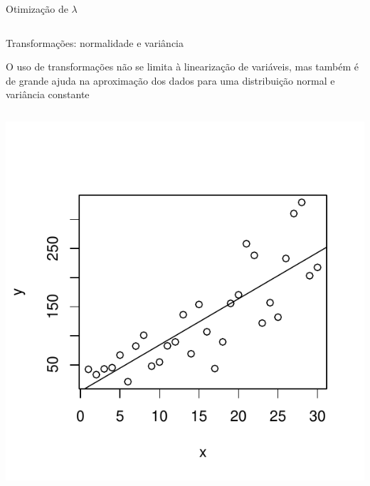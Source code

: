 \documentclass{beamer}\usepackage[]{graphicx}\usepackage[]{color}
\newenvironment{knitrout}{}{} %
\renewenvironment{knitrout}{\setlength{\topsep}{0mm}}{}
\begin{document}
\begin{frame}[fragile]{Otimização de $\lambda$}
\begin{columns}[c]
\begin{knitrout}
\end{knitrout}

\end{columns}

\end{frame}


\begin{frame}{Transformações: normalidade e variância}

 O uso de transformações não se limita à linearização de variáveis, mas também é de grande ajuda na aproximação dos dados para uma distribuição normal e variância constante
\begin{columns}[c]


\begin{knitrout}\scriptsize
{}\color{fgcolor}
\includegraphics[width=0.9\linewidth]{figure/t1-1} 

\end{knitrout}


\centering


\end{columns}
\end{frame}
\end{document}

